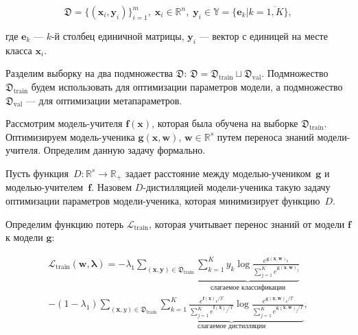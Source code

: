\documentclass[12pt]{a&t}
\begin{document}
$$
    \mathfrak{D} = \{(\mathbf{x}_i, \mathbf{y}_i)\}_{i=1}^{m},\; \mathbf{x}_i \in \mathbb{R}^n,\; \mathbf{y}_i \in \mathbb{Y} = \{\mathbf{e}_k | k = \overline{1, K}\},
$$

\noindent
где $\mathbf{e}_k$ --- $k$-й столбец единичной матрицы, $\mathbf{y}_i$ --- вектор с единицей на месте класса $\mathbf{x}_i$.

Разделим выборку на два подмножества $\mathfrak{D}$: $\mathfrak{D} = \mathfrak{D}_\text{train} \sqcup \mathfrak{D}_\text{val}.$ Подмножество $\mathfrak{D}_\text{train}$ будем использовать для оптимизации параметров модели, а подмножество $\mathfrak{D}_\text{val}$ --- для оптимизации метапараметров.

Рассмотрим модель-учителя $\mathbf{f}(\mathbf{x})$, которая была обучена на выборке $\mathfrak{D}_\text{train}$. Оптимизируем модель-ученика $\mathbf{g}(\mathbf{x}, \mathbf{w})$, $\mathbf{w} \in \mathbb{R}^s$ путем переноса знаний модели-учителя. Определим данную задачу формально.

\begin{definition}
Пусть функция~$D: \mathbb{R}^s \to \mathbb{R}_{+}$ задает расстояние между моделью-учеником~$\mathbf{g}$ и моделью-учителем~$\mathbf{f}$. Назовем $D$-дистилляцией модели-ученика такую задачу оптимизации параметров модели-ученика, которая минимизирует функцию~$D$.
\end{definition}

Определим функцию потерь $\mathcal{L}_\text{train}$, которая учитывает перенос знаний от модели $\mathbf{f}$ к модели $\mathbf{g}$:


\begin{multline*}
    \mathcal{L}_\text{train}(\mathbf{w}, \boldsymbol{\lambda}) = -\lambda_1\sum\limits_{(\mathbf{x}, \mathbf{y}) \in \mathfrak{D}_\text{train}}\underbrace{\sum\limits_{k=1}^{K}y_k\log \frac{e^{\mathbf{g}(\mathbf{x}, \mathbf{w})_k}}{\sum\limits_{j=1}^{K}e^{\mathbf{g}(\mathbf{x}, \mathbf{w})_j}}}_{\text{слагаемое классификации}} \\- (1 - \lambda_1)\sum\limits_{(\mathbf{x}, y) \in \mathfrak{D}_\text{train}}\underbrace{\sum\limits_{k=1}^{K}\frac{e^{\mathbf{f}(\mathbf{x})_k/T}}{\sum\limits_{j=1}^{K}e^{\mathbf{f}(\mathbf{x})_j/T}}\log \frac{e^{\mathbf{g}(\mathbf{x}, \mathbf{w})_k/T}}{\sum\limits_{j=1}^{K}e^{\mathbf{g}(\mathbf{x}, \mathbf{w})_j/T}}}_{\text{слагаемое дистилляции}},
\end{multline*}
\end{document}

